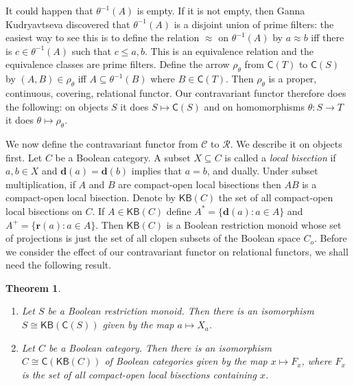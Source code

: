 \documentclass[a4paper]{amsart}
\newtheorem{theorem}{Theorem}[section]
\begin{document}
It could happen that $\theta^{-1}(A)$ is empty.
If it is not empty, then Ganna Kudryavtseva discovered that $\theta^{-1}(A)$
is a disjoint union of prime filters: the easiest way to see this is to define the relation $\approx$ on  
$\theta^{-1}(A)$ by $a \approx b$ iff there is $c \in \theta^{-1}(A)$ such that $c \leq a,b$.
This is an equivalence relation and the equivalence classes are prime filters.
Define the arrow $\rho_{\theta}$ from  $\mathsf{C}(T)$ to $\mathsf{C}(S)$ by $(A,B) \in \rho_{\theta}$ iff
$A \subseteq \theta^{-1}(B)$  where $B \in \mathsf{C}(T)$.
Then $\rho_{\theta}$ is a proper, continuous, covering, relational functor.
Our contravariant functor therefore does the following: on objects $S$ it does $S \mapsto \mathsf{C}(S)$
and on homomorphisms $\theta \colon S \rightarrow T$ it does $\theta \mapsto \rho_{\theta}$.


We now define the contravariant functor from  $\mathscr{C}$ to $\mathscr{R}$.
We describe it on objects first.
Let $C$ be a Boolean category.
A subset $X \subseteq C$ is called a {\em local bisection}
if $a,b \in X$ and $\mathbf{d}(a) = \mathbf{d}(b)$ implies that $a = b$, and dually.
Under subset multiplication, if $A$ and $B$ are compact-open local bisections
then $AB$ is a compact-open local bisection.
Denote by $\mathsf{KB}(C)$ the set of all compact-open local bisections on $C$.
If $A \in \mathsf{KB}(C)$ define $A^{\ast} = \{\mathbf{d}(a) \colon a \in A\}$
and $A^{+} = \{\mathbf{r}(a) \colon a \in A\}$.
Then $\mathsf{KB}(C)$ is a Boolean restriction monoid whose set of projections is
just the set of all clopen subsets of the Boolean space $C_{o}$.
Before we consider the effect of our contravariant functor on relational functors,
we shall need the following result.

\begin{theorem}\label{them:epic}\mbox{}
\begin{enumerate}

\item Let $S$ be a Boolean restriction monoid.
Then there is an isomorphism $S \cong \mathsf{KB}(\mathsf{C}(S))$ given by the map
$a \mapsto X_{a}$.

\item Let $C$ be a Boolean category.
Then there is an isomorphism $C \cong \mathsf{C}(\mathsf{KB}(C))$ of Boolean categories
given by the map $x \mapsto F_{x}$, where $F_{x}$ is the set of all compact-open local bisections
containing $x$.

\end{enumerate}
\end{theorem}
\end{document}
